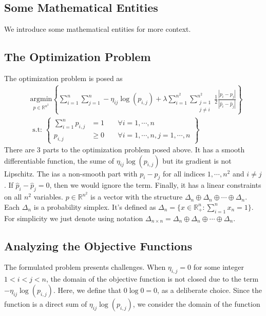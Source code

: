 \documentclass[11pt]{article}
\theoremstyle{definition}
\numberwithin{equation}{subsection}
\begin{document}
    \subsection{Some Mathematical Entities}
        We introduce some mathematical entities for more context. 

    \subsection{The Optimization Problem}
    The optimization problem is posed as 
        \begin{align}
            &\underset{p \in \mathbb R^{n^2}}{\text{argmin}} 
            \left\lbrace
                \sum_{i = 1}^{n}\sum_{j = 1}^{n}
                    -\eta_{ij}\log(p_{i, j})
                + 
                \lambda \sum_{i=1}^{n^2}\sum_{\substack{j=1\\j\neq i}}^{n^2}
                \frac{1}{2}
                \frac{|p_{i} - p_j|}{|\hat p_{i} - \hat p_j|}
                \right\rbrace
                \\
                &\text{ s.t: }
                \left\lbrace
                \begin{aligned}
                    \sum_{i = 1}^{n} p_{i, j} &= 1 \; && \forall i =1, \cdots, n 
                    \\
                    p_{i, j} &\ge 0\; &&\forall i= 1,\cdots, n, j = 1,\cdots, n 
                \end{aligned}
                \right\rbrace
            \label{eqn:original_formulaion}
        \end{align}
        There are 3 parts to the optimization problem posed above. 
        It has a smooth differentiable function, the sume of $\eta_{ij}\log(p_{i,j})$ but its gradient is not Lipschitz. 
        The ias a non-smooth part with $p_i - p_j$ for all indices $1,\cdots, n^2$ and $i\neq j$. 
        If $\hat p_i - \hat p_j = 0$, then we would ignore the term. 
        Finally, it has a linear constraints on all $n^2$ variables. 
        $p\in \mathbb R^{n^2}$ is a vector with the structure $\Delta_n\oplus\Delta_n\oplus \cdots \oplus \Delta_n$. 
        Each $\Delta_n$ is a probability simplex. 
        It's defined as $\Delta_n = \{x\in \mathbb R^n_+ : \sum_{i =1}^{n}x_n = 1\}$. 
        For simplicity we just denote using notation $\Delta_{n\times n} = \Delta_n\oplus\Delta_n\oplus \cdots \oplus \Delta_n$. 
    
    \subsection{Analyzing the Objective Functions}
        The formulated problem presents challenges. 
        When $\eta_{i, j} = 0$ for some integer $1<  i < j <n$, the domain of the objective function is not closed due to the term $-\eta_{ij} \log(p_{i, j})$. 
        Here, we define that $0 \log 0 = 0$, as a deliberate choice. 
        Since the function is a direct sum of $\eta_{ij}\log(p_{i, j})$, we consider the domain of the function 
        \begin{align*}
            
        \end{align*}
\end{document}
